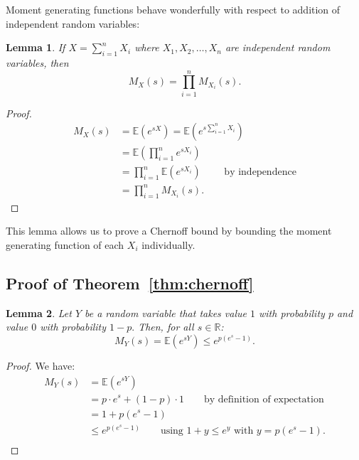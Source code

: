 \documentclass[10pt]{article}
\newtheorem{lemma}{Lemma}
\newcommand{\E}{\mathbb{E}}
\begin{document}
Moment generating functions behave wonderfully with respect to addition of independent random variables:
\begin{lemma}\label{lem:mgf_add}
    If $X = \sum_{i=1}^n X_i$ where $X_1, X_2, \ldots, X_n$ are independent random variables, then 
    \[ M_X(s) = \prod_{i=1}^n M_{X_i}(s). \]
\end{lemma}
\begin{proof}
    \begin{align*}
        M_X(s) &= \E(e^{sX}) = \E\left(e^{s\sum_{i=1}^n X_i}\right)\\
               &= \E\left(\prod_{i=1}^n e^{sX_i}\right)\\
               &= \prod_{i=1}^n \E(e^{sX_i}) \qquad \text{ by independence}\\
               &= \prod_{i=1}^n M_{X_i}(s).
    \end{align*}
\end{proof}
This lemma allows us to prove a Chernoff bound by bounding the moment
generating function of each $X_i$ individually. 

\subsection{Proof of Theorem~\ref{thm:chernoff}}

\begin{lemma} \label{lem:bernoulli_mgf}
Let $Y$ be a random variable that takes value $1$ with probability $p$ and value $0$ with probability $1-p.$ Then, for all $s \in \mathbb{R}$:
$$
M_{Y}(s) = \E(e^{sY}) \leq e^{p(e^s-1)}.
$$
\end{lemma}
\begin{proof}
    We have:
    \begin{align*}
     M_{Y}(s) &= \E(e^{sY})\\
                   &= p \cdot e^{s} + (1-p)\cdot 1 \qquad \text{by definition of expectation}\\
                   &= 1 + p(e^s - 1)\\
                   &\leq e^{p(e^s-1)} \qquad \text{using $1+y \leq e^y$ with $y=p(e^s-1)$}.\\
    \end{align*}
\end{proof}
\end{document}
